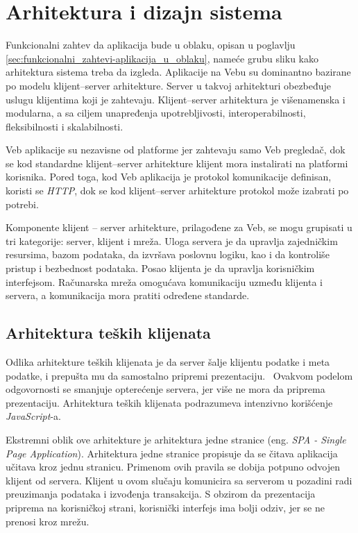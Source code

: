 \chapter{Arhitektura i dizajn sistema}\label{ch:arhitektura}

Funkcionalni zahtev da aplikacija bude u oblaku, opisan u poglavlju 
\ref{sec:funkcionalni_zahtevi-aplikacija_u_oblaku}, nameće grubu sliku kako arhitektura sistema 
treba da izgleda. Aplikacije na Vebu su dominantno bazirane po modelu klijent--server arhitekture. 
Server u takvoj arhitekturi obezbeđuje uslugu klijentima koji je zahtevaju. Klijent--server 
arhitektura je višenamenska i modularna, a sa ciljem unapređenja upotrebljivosti, interoperabilnosti, 
fleksibilnosti i skalabilnosti. 

Veb aplikacije su nezavisne od platforme jer zahtevaju samo Veb pregledač, dok se kod standardne 
klijent--server arhitekture klijent mora instalirati na platformi korisnika. Pored toga, 
kod Veb aplikacija je protokol komunikacije definisan, koristi se \textit{HTTP}, dok se kod klijent--server
arhitekture protokol može izabrati po potrebi.

Komponente klijent -- server arhitekture, prilagođene za Veb, se mogu grupisati u tri kategorije: 
server, klijent i mreža. Uloga servera je da upravlja zajedničkim resursima, bazom podataka, da 
izvršava poslovnu logiku, kao i da kontroliše pristup i bezbednost podataka. Posao klijenta je da 
upravlja korisničkim interfejsom. Računarska mreža omogućava komunikaciju uzmeđu klijenta i servera, 
a komunikacija mora pratiti određene standarde.

\section{Arhitektura teških klijenata}\label{sec:arhitektura-spa}

Odlika arhitekture teških klijenata je da server šalje klijentu podatke i meta podatke, i prepušta 
mu da samostalno pripremi prezentaciju.~\cite{PVEB} Ovakvom podelom odgovornosti se smanjuje opterećenje 
servera, jer više ne mora da priprema prezentaciju. Arhitektura teških klijenata podrazumeva intenzivno 
korišćenje \textit{JavaScript}-a.

Ekstremni oblik ove arhitekture je arhitektura jedne stranice (eng. \textit{SPA - Single Page Application}).
Arhitektura jedne stranice propisuje da se čitava aplikacija učitava kroz jednu stranicu. Primenom 
ovih pravila se dobija potpuno odvojen klijent od servera. Klijent u ovom slučaju komunicira 
sa serverom u pozadini radi preuzimanja podataka i izvođenja transakcija. S obzirom da prezentacija
priprema na korisničkoj strani, korisnički interfejs ima bolji odziv, jer se ne prenosi kroz mrežu.

